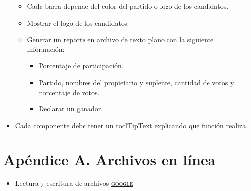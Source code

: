 \documentclass[11pt]{article}
\begin{document}
\begin{itemize}
\begin{itemize}
\item Cada barra depende del color del partido o logo de los candidatos.
\item Mostrar el logo de los candidatos.
\item Generar un reporte en archivo de texto plano con la siguiente información:
\begin{itemize}
\item Porcentaje de participación.
\item Partido, nombres del propietario y suplente, cantidad de votos y porcentaje de votos.
\item Declarar un ganador.
\end{itemize}
\end{itemize} 
\item Cada componente debe tener un \textsf{toolTipText} explicando que función realiza.
\end{itemize}
\newpage


\section{Apéndice A. Archivos en línea}

\begin{itemize}
\item Lectura y escritura de archivos \href{www.google.com}{\textsc{google}}
\end{itemize}

\newpage


\newpage


\end{document}
